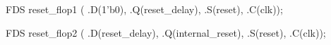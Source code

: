 \begin{vcode}
FDS reset_flop1 ( 
    .D(1'b0),
    .Q(reset_delay),
    .S(reset),
    .C(clk));

FDS reset_flop2 ( 
    .D(reset_delay),
    .Q(internal_reset),
    .S(reset),
    .C(clk));
\end{vcode}

